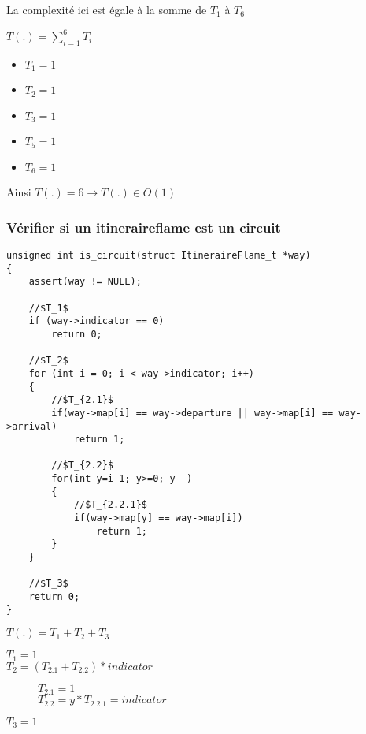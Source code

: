 La complexité ici est égale à la somme de $T_1$ à $T_6$

$T(.) = \sum_{i=1}^{6} T_i$

\begin{itemize}
    \item $T_1 = 1$
    \item $T_2 = 1$
    \item $T_3 = 1$
    \item $T_5 = 1$
    \item $T_6 = 1$
\end{itemize}

Ainsi $T(.) = 6 \rightarrow T(.) \in O(1)$


\subsubsection{Vérifier si un itineraireflame est un circuit}

\raggedright

\begin{lstlisting}
unsigned int is_circuit(struct ItineraireFlame_t *way)
{
    assert(way != NULL);

    //$T_1$
    if (way->indicator == 0)
        return 0;

    //$T_2$
    for (int i = 0; i < way->indicator; i++)
    {
        //$T_{2.1}$
        if(way->map[i] == way->departure || way->map[i] == way->arrival)
            return 1;

        //$T_{2.2}$
        for(int y=i-1; y>=0; y--)
        {
            //$T_{2.2.1}$
            if(way->map[y] == way->map[i])
                return 1;
        }
    }

    //$T_3$
    return 0;
}
\end{lstlisting}

$T(.) = T_1 + T_2 + T_3$

\begin{description}
    \item[$T_1 = 1$] 
    \item[$T_2 = (T_{2.1} + T_{2.2})*indicator$]
    \indent
    \begin{description}
        \item[$T_{2.1} = 1$] 
        \item[$T_{2.2} = y*T_{2.2.1}=indicator$] 
    \end{description} 
    \item[$T_3 = 1$] 
\end{description}

